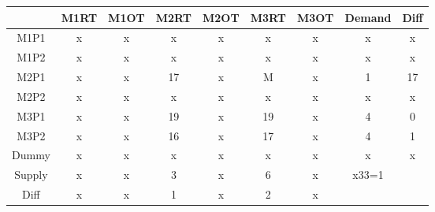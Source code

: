\documentclass{article}%
\begin{document}
\begin{tabular}{c|cc|c|ccccc}
    & M1RT & M1OT & M2RT & M2OT & M3RT & M3OT & Demand               & Diff                 \\
    \midrule
    M1P1   & x    & x    & x    & x    & x    & x    & x                    & x                    \\
    M1P2   & x    & x    & x    & x    & x    & x    & x                    & x                    \\
    \cmidrule{2-9}
    M2P1   & x    & x    & 17   & x    & M    & x    & 1                    & 17                   \\
    \cmidrule{2-9}
    M2P2   & x    & x    & x    & x    & x    & x    & x                    & x                    \\
    M3P1   & x    & x    & 19   & x    & 19   & x    & 4                    & 0                    \\
    M3P2   & x    & x    & 16   & x    & 17   & x    & 4                    & 1                    \\
    Dummy  & x    & x    & x    & x    & x    & x    & x                    & x                    \\
    Supply & x    & x    & 3    & x    & 6    & x    & x33=1                &                      \\
    Diff   & x    & x    & 1    & x    & 2    & x    &                      &                      \\
\end{tabular}
\newline
\newline
\end{document}
